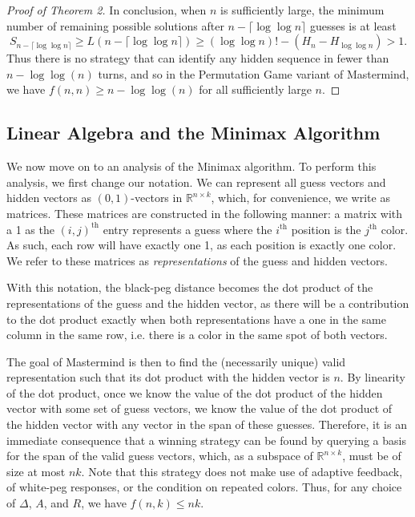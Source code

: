 \documentclass[12pt, a4paper]{article}
\newcommand{\R}{\mathbb{R}}           %
\begin{document}
\begin{proof}[Proof of Theorem 2]
 	In conclusion, when $n$ is sufficiently large, the minimum number of remaining
	possible solutions after $n - \lceil \log\log n \rceil$ guesses is at least
		\begin{equation*}
		S_{n - \lceil \log\log n \rceil} \geq L(n - \lceil \log\log n \rceil)
		 \ge (\log\log n)! - (H_n - H_{\log\log n})
		 > 1.
		\end{equation*}
	Thus there is no strategy that can identify any hidden sequence in fewer than $n-\log\log(n)$ turns, and so in the Permutation Game variant of Mastermind, we have $f(n, n)\ge n - \log\log(n)$ for all sufficiently large $n$.
	\end{proof}

\subsection{Linear Algebra and the Minimax Algorithm}
We now move on to an analysis of the Minimax algorithm. To perform this analysis, we first change our notation. We can represent all guess vectors and hidden vectors as $(0,1)$-vectors in $\R^{n\times k}$, which, for convenience, we write as matrices. These matrices are constructed in the following manner: a matrix with a 1 as the $(i,j)^\text{th}$ entry represents a guess where the $i^\text{th}$ position is the $j^\text{th}$ color. As such, each row will have exactly one 1, as each position is exactly one color. We refer to these matrices as \textit{representations} of the guess and hidden vectors.

With this notation, the black-peg distance becomes the dot product of the representations of the guess and the hidden vector, as there will be a contribution to the dot product exactly when both representations have a one in the same column in the same row, i.e. there is a color in the same spot of both vectors. 

The goal of Mastermind is then to find the (necessarily unique) valid representation such that its dot product with the hidden vector is $n$. By linearity of the dot product, once we know the value of the dot product of the hidden vector with some set of guess vectors, we know the value of the dot product of the hidden vector with any vector in the span of these guesses. Therefore, it is an immediate consequence that a winning strategy can be found by querying a basis for the span of the valid guess vectors, which, as a subspace of $\R^{n\times k}$, must be of size at most $nk$. Note that this strategy does not make use of adaptive feedback, of white-peg responses, or the condition on repeated colors. Thus, for any choice of $\Delta$, $A$, and $R$, we have $f(n,k) \leq nk$.
\end{document}
